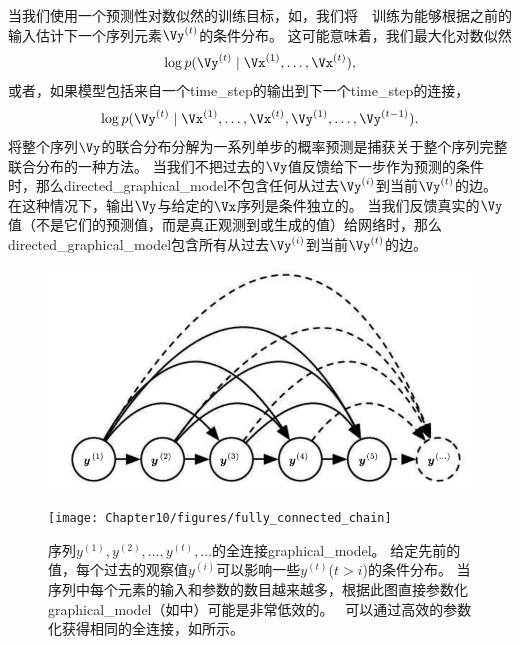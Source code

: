 当我们使用一个预测性对数似然的训练目标，如，我们将~~训练为能够根据之前的输入估计下一个序列元素$\Vy^{(t)}$的条件分布。
这可能意味着，我们最大化对数似然
\begin{align}
 \log p(\Vy^{(t)} \mid \Vx^{(1)},\dots, \Vx^{(t)}),
\end{align}
或者，如果模型包括来自一个\gls{time_step}的输出到下一个\gls{time_step}的连接，
\begin{align}
 \log p(\Vy^{(t)} \mid \Vx^{(1)},\dots, \Vx^{(t)},\Vy^{(1)},\dots, \Vy^{(t-1)} ).
\end{align}
将整个序列$\Vy$的联合分布分解为一系列单步的概率预测是捕获关于整个序列完整联合分布的一种方法。
当我们不把过去的$\Vy$值反馈给下一步作为预测的条件时，那么\gls{directed_graphical_model}不包含任何从过去$\Vy^{(i)}$到当前$\Vy^{(t)}$的边。
在这种情况下，输出$\Vy$与给定的$\Vx$序列是条件独立的。
当我们反馈真实的$\Vy$值（不是它们的预测值，而是真正观测到或生成的值）给网络时，那么\gls{directed_graphical_model}包含所有从过去$\Vy^{(i)}$到当前$\Vy^{(t)}$的边。
\begin{figure}[!htb]
\ifOpenSource
\centerline{\includegraphics[scale=0.5]{images/95.png}}
\else
\centerline{\texttt{[image: Chapter10/figures/fully\_connected\_chain]}}
\fi
\caption{序列$y^{(1)},y^{(2)},\dots,y^{(t)},\dots$的全连接\gls{graphical_model}。
给定先前的值，每个过去的观察值$y^{(i)}$可以影响一些$y^{(t)}$($t>i$)的条件分布。
当序列中每个元素的输入和参数的数目越来越多，根据此图直接参数化\gls{graphical_model}（如中）可能是非常低效的。
~可以通过高效的参数化获得相同的全连接，如所示。
}
\label{fig:chap10_fully_connected_chain}
\end{figure}


